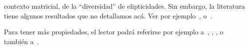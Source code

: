 \begin{itemize}
  contexto matricial,  de la ``diversidad''  de elipticidades.  Sin  embargo, la
  literatura  tiene  algunos  resultados   que  no  detallamos  ac\'a.  Ver  por
  ejemplo~\cite{GupVar95}, o~\cite[Teo.~10-12]{DiaGut11}.
%
%
%
%
\end{itemize}

Para  tener   m\'as  propiedades,  el  lector  podr\'a   referirse  por  ejemplo
a~\cite{FanChe84},  \cite[\S~9.2 \&~9.3]{GupNag99},  \cite[\S~13.2]{BilBre99}, o
tambi\'en a~\cite{And03, Daw78, Daw81, LibrosABuscar}.


